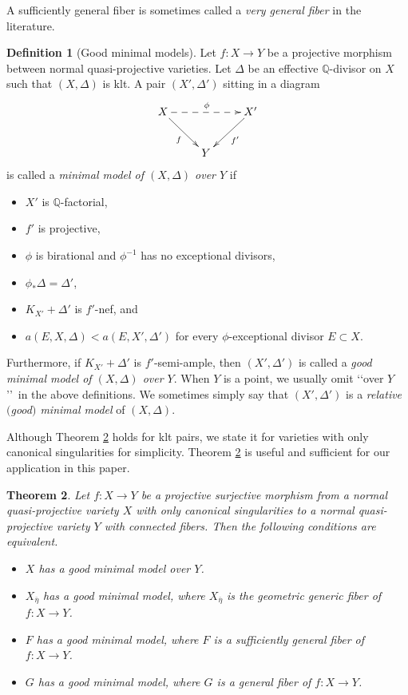 \documentclass[12pt,twoside]{amsart}
\newtheorem{thm}{Theorem}[section]
\theoremstyle{definition}
\newtheorem{defn}[thm]{Definition}
\begin{document}
A sufficiently general fiber is sometimes called a {\em{very general fiber}} 
in the literature. 

\begin{defn}[Good minimal models]\label{def3.2}
Let $f:X\to Y$ be a projective morphism between normal 
quasi-projective 
varieties. 
Let $\Delta$ be an effective $\mathbb Q$-divisor on $X$ such that 
$(X, \Delta)$ is klt. 
A pair $(X', \Delta')$ sitting in a diagram 
$$
\xymatrix{
X\ar[dr]_{f}\ar@{-->}[rr]^\phi&& X'\ar[dl]^{f'}\\
&Y&
}
$$
is called a {\em{minimal model of $(X, \Delta)$ over $Y$}} if 
\begin{itemize}
\item[(i)] $X'$ is $\mathbb Q$-factorial, 
\item[(ii)] $f'$ is projective, 
\item[(iii)] $\phi$ is birational and $\phi^{-1}$ has no 
exceptional divisors, 
\item[(iv)] $\phi_*\Delta=\Delta'$, 
\item[(v)] $K_{X'}+\Delta'$ is $f'$-nef, and 
\item[(vi)] $a(E, X, \Delta)<a(E, X', \Delta')$ for every $\phi$-exceptional 
divisor $E\subset X$. 
\end{itemize}
Furthermore, if $K_{X'}+\Delta'$ is $f'$-semi-ample, 
then $(X', \Delta')$ is called a {\em{good minimal model 
of $(X, \Delta)$ over $Y$}}. 
When $Y$ is a point, we usually omit \lq\lq over $Y$\rq\rq \ in the above definitions. 
We sometimes simply say that $(X', \Delta')$ is a {\em{relative 
$($good$)$ minimal model}} of $(X, \Delta)$. 
\end{defn}

Although Theorem \ref{thm3.3} holds for klt pairs, we state it for 
varieties with only canonical singularities for simplicity. 
Theorem \ref{thm3.3} is useful and sufficient for our application in 
this paper. 

\begin{thm}\label{thm3.3} 
Let $f:X\to Y$ be a projective surjective morphism 
from a normal quasi-projective variety $X$ with 
only canonical singularities to 
a normal quasi-projective variety $Y$ with connected fibers. 
Then the following conditions are equivalent. 
\begin{itemize}
\item[(i)] $X$ has a good minimal model over $Y$. 
\item[(ii)] $X_{\overline \eta}$ has a good minimal model, 
where $X_{\overline \eta}$ is the geometric generic fiber of $f:X\to Y$. 
\item[(iii)] $F$ has a good minimal model, where $F$ is 
a sufficiently general fiber of $f:X\to Y$. 
\item[(iv)] $G$ has a good minimal model, where $G$ is a 
general fiber of $f:X\to Y$. 
\end{itemize}
\end{thm}
\end{document}
